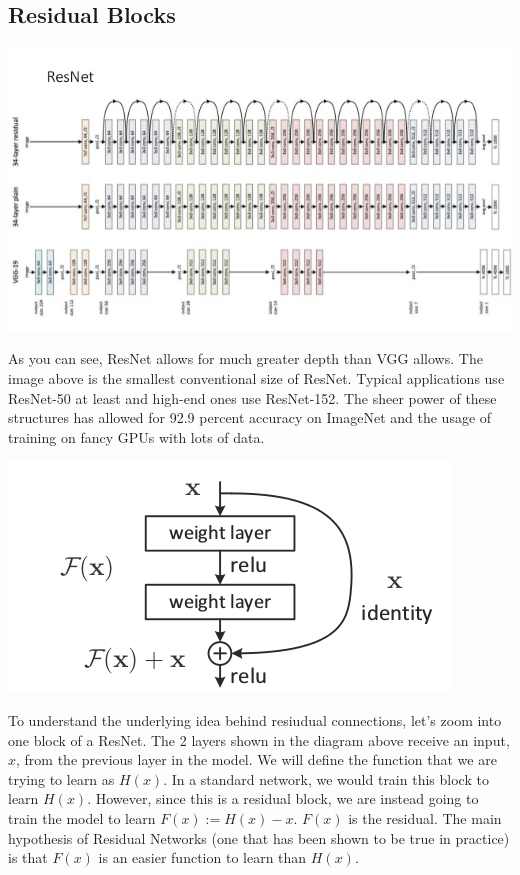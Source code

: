 \documentclass{article}
\begin{document}
\subsection{Residual Blocks}
\begin{center}
\includegraphics[scale=0.5]{resnet.jpg}
\end{center}
As you can see, ResNet allows for much greater depth than VGG allows. The image above is the smallest conventional size of ResNet. Typical applications use ResNet-50 at least and high-end ones use ResNet-152. The sheer power of these structures has allowed for 92.9 percent accuracy on ImageNet and the usage of training on fancy GPUs with lots of data.

\begin{center}
\includegraphics[scale=0.5]{resnet}
\end{center}
To understand the underlying idea behind resiudual connections, let's zoom into one block of a ResNet. The 2 layers shown in the diagram above receive an input, $x$, from the previous layer in the model. We will define the function that we are trying to learn as $H(x)$. In a standard network, we would train this block to learn $H(x)$. However, since this is a residual block, we are instead going to train the model to learn $F(x) := H(x) - x$. $F(x)$ is the residual. The main hypothesis of Residual Networks (one that has been shown to be true in practice) is that $F(x)$ is an easier function to learn than $H(x)$. \\
\end{document}
